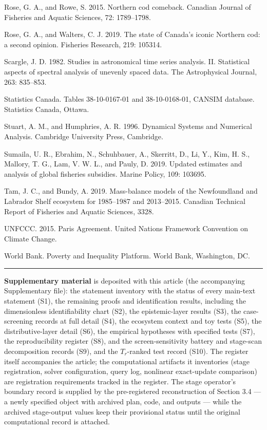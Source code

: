 \documentclass[11pt]{article}
\begin{document}
Rose, G. A., and Rowe, S. 2015. Northern cod comeback. Canadian Journal
of Fisheries and Aquatic Sciences, 72: 1789--1798.

Rose, G. A., and Walters, C. J. 2019. The state of Canada's iconic
Northern cod: a second opinion. Fisheries Research, 219: 105314.

Scargle, J. D. 1982. Studies in astronomical time series analysis. II.
Statistical aspects of spectral analysis of unevenly spaced data. The
Astrophysical Journal, 263: 835--853.

Statistics Canada. Tables 38-10-0167-01 and 38-10-0168-01, CANSIM
database. Statistics Canada, Ottawa.

Stuart, A. M., and Humphries, A. R. 1996. Dynamical Systems and Numerical Analysis. Cambridge University Press, Cambridge.

Sumaila, U. R., Ebrahim, N., Schuhbauer, A., Skerritt, D., Li, Y., Kim, H. S., Mallory, T. G., Lam, V. W. L., and Pauly, D. 2019. Updated estimates and analysis of global fisheries subsidies. Marine Policy, 109: 103695.

Tam, J. C., and Bundy, A. 2019. Mass-balance models of the Newfoundland
and Labrador Shelf ecosystem for 1985--1987 and 2013--2015. Canadian
Technical Report of Fisheries and Aquatic Sciences, 3328.

UNFCCC. 2015. Paris Agreement. United Nations Framework Convention on Climate Change.

World Bank. Poverty and Inequality Platform. World Bank, Washington, DC.

\begin{center}\rule{0.5\linewidth}{0.5pt}\end{center}

\textbf{Supplementary material} is deposited with this article (the accompanying Supplementary file): the statement
inventory with the status of every main-text statement (S1), the
remaining proofs and identification results, including the dimensionless
identifiability chart (S2), the epistemic-layer results (S3), the
case-screening records at full detail (S4), the ecosystem context and
toy tests (S5), the distributive-layer detail (S6), the empirical
hypotheses with specified tests (S7), the reproducibility register
(S8), and the screen-sensitivity battery and stage-scan decomposition
records (S9), and the \(T_r\)-ranked test record (S10). The register itself accompanies the article; the computational
artifacts it inventories (stage registration, solver configuration,
query log, nonlinear exact-update comparison) are registration
requirements tracked in the register. The stage operator's boundary
record is supplied by the pre-registered reconstruction of
Section 3.4 --- a newly specified object with archived plan, code, and
outputs --- while the archived stage-output values keep their
provisional status until the original computational record is attached.
\end{document}
